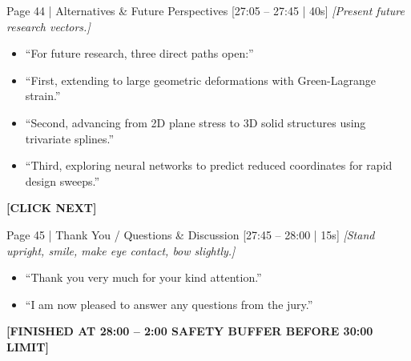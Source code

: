 \documentclass[9pt,a4paper]{article}
\begin{document}
\begin{slidebox}{Page 44 | Alternatives \& Future Perspectives \hfill [27:05 -- 27:45 | 40s]}
\textit{[Present future research vectors.]}
\begin{itemize}
  \item ``For future research, three direct paths open:''
  \item ``First, extending to large geometric deformations with Green-Lagrange strain.''
  \item ``Second, advancing from 2D plane stress to 3D solid structures using trivariate splines.''
  \item ``Third, exploring neural networks to predict reduced coordinates for rapid design sweeps.''
\end{itemize}
\textbf{\color{cnamred}[CLICK NEXT]}
\end{slidebox}

\begin{slidebox}{Page 45 | Thank You / Questions \& Discussion \hfill [27:45 -- 28:00 | 15s]}
\textit{[Stand upright, smile, make eye contact, bow slightly.]}
\begin{itemize}
  \item ``Thank you very much for your kind attention.''
  \item ``I am now pleased to answer any questions from the jury.''
\end{itemize}
\textbf{\color{cnamred}[FINISHED AT 28:00 -- 2:00 SAFETY BUFFER BEFORE 30:00 LIMIT]}
\end{slidebox}
\end{document}
